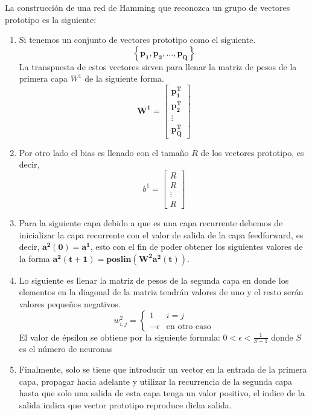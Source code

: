 \documentclass[12pt, titlepage]{article}
\begin{document}
        La construcción de una red de Hamming que reconozca un grupo de vectores prototipo es la siguiente:
        \begin{enumerate}
            \item Si tenemos un conjunto de vectores prototipo como el siguiente.
            \[ \left\lbrace \boldsymbol{p_1, p_2, ..., p_Q} \right\rbrace  \]
            La transpuesta de estos vectores sirven para llenar la matriz de pesos de la primera capa $W^1$ de la siguiente forma.
            \[\boldsymbol{ W^{1}} = \left[\begin{array}{c}\boldsymbol{p^{T}_1}\\\boldsymbol{ p^{T}_2}\\ \vdots \\ \boldsymbol{p^{T}_Q}\end{array}\right]  \]
            \item Por otro lado el bias es llenado con el tamaño $R$ de los vectores prototipo, es decir,
            \[ b^{1} = \left[\begin{array}{c}R\\ R\\ \vdots \\ R\end{array}\right] \]
            \item Para la siguiente capa debido a que es una capa recurrente debemos de inicializar la capa recurrente con el valor de salida de la capa feedforward, es decir, $\boldsymbol{a^2(0) = a^1}$, esto con el fin de poder obtener los siguientes valores de la forma $\boldsymbol{a^2(t+1) = poslin(W^2a^2(t))}$.
            \item Lo siguiente es llenar la matriz de pesos de la segunda capa en donde los elementos en la diagonal de la matriz tendrán valores de uno y el resto serán valores pequeños negativos.
            \[ w^2_{i,j} = \begin{cases} 1 & i=j \\-\epsilon & \text{en otro caso} \end{cases} \]
            El valor de épsilon se obtiene por la siguiente formula: $ 0 < \epsilon <\frac{1}{S-1}$ donde $S$ es el número de neuronas
            \item Finalmente, solo se tiene que introducir un vector en la entrada de la primera capa, propagar hacia adelante y utilizar la recurrencia de la segunda capa hasta que solo una salida de esta capa tenga un valor positivo, el indice de la salida indica que vector prototipo reproduce dicha salida.
        \end{enumerate}
    \newpage
\end{document}
